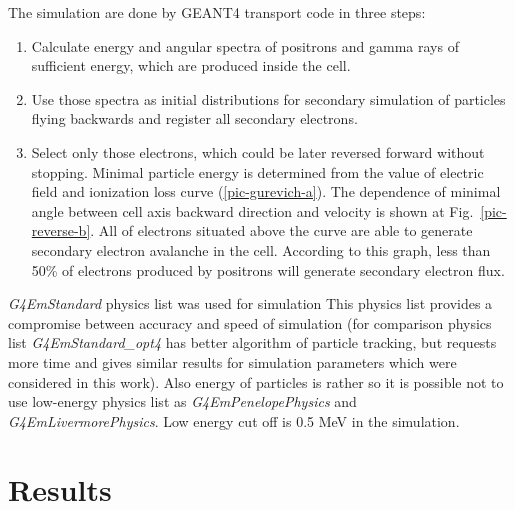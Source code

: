 \documentclass[utf8]{webofc}
\begin{document}
    The simulation are done by GEANT4 transport code \cite{ALLISON2016186} in three steps:
    
    \begin{enumerate}
        \item Calculate energy and angular spectra of positrons and gamma rays of sufficient energy, which are produced inside the cell.
        \item Use those spectra as initial distributions for secondary simulation of particles flying backwards and register all secondary electrons.
        \item Select only those electrons, which could be later reversed forward without stopping. Minimal particle energy is determined from the value of electric field and ionization loss curve (\ref{pic-gurevich-a}). The dependence of minimal angle between cell axis backward direction and velocity is shown at Fig.~\ref{pic-reverse-b}.  All of electrons situated above the curve are able to generate secondary electron avalanche in the cell. According to this graph, less than 50\% of electrons produced by positrons will generate secondary electron flux.
    \end{enumerate}
    \textit{G4EmStandard} physics list was used for simulation This physics list provides a compromise between accuracy and speed of simulation (for comparison physics list \textit{G4EmStandard\_opt4} has better algorithm of particle tracking, but requests more time and gives similar results for simulation parameters which were considered in this work). Also energy of particles is rather so it is possible not to use low-energy physics list as \textit{G4EmPenelopePhysics} and \textit{G4EmLivermorePhysics}. Low energy cut off is 0.5 MeV in the simulation.
    
    
    
    \section{Results}
    
\end{document}

